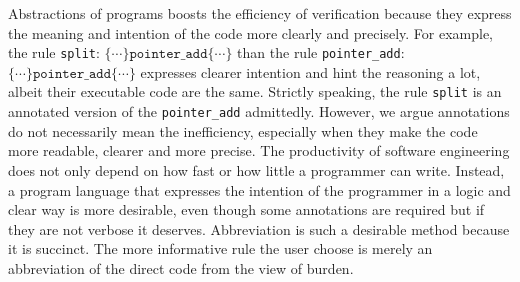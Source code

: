 Abstractions of programs boosts the efficiency of verification because they express the meaning and intention of the code more clearly and precisely. For example, the rule \texttt{split}: $\{\cdots\}\texttt{pointer\_add}\{\cdots\}$ than the rule \texttt{pointer\_add}: $\{\cdots\}\texttt{pointer\_add}\{\cdots\}$ expresses clearer intention and hint the reasoning a lot, albeit their executable code are the same. Strictly speaking, the rule \texttt{split} is an annotated version of the \texttt{pointer\_add} admittedly. However, we argue annotations do not necessarily mean the inefficiency, especially when they make the code more readable, clearer and more precise. The productivity of software engineering does not only depend on how fast or how little a programmer can write. Instead, a program language that expresses the intention of the programmer in a logic and clear way is more desirable, even though some annotations are required but if they are not verbose it deserves. Abbreviation is such a desirable method because it is succinct. The more informative rule the user choose is merely an abbreviation of the direct code from the view of burden.
